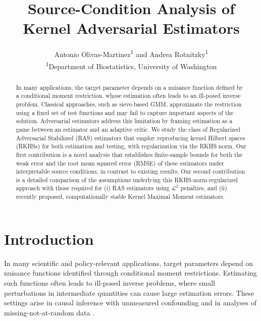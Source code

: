 \documentclass[twoside,11pt]{article}
\begin{document}
\title{Source-Condition Analysis of Kernel Adversarial Estimators}

\author{
Antonio Olivas-Martinez\textsuperscript{1} and Andrea Rotnitzky\textsuperscript{1} \\
\textsuperscript{1}Department of Biostatistics, University of Washington
}

\maketitle

\begin{abstract}
In many applications, the target parameter depends on a nuisance function defined by a conditional moment restriction, whose estimation often leads to an ill-posed inverse problem. Classical approaches, such as sieve-based GMM, approximate the restriction using a fixed set of test functions and may fail to capture important aspects of the solution. Adversarial estimators address this limitation by framing estimation as a game between an estimator and an adaptive critic. We study the class of Regularized Adversarial Stabilized (RAS) estimators that employ reproducing kernel Hilbert spaces (RKHSs) for both estimation and testing, with regularization via the RKHS norm. Our first contribution is a novel analysis that establishes finite-sample bounds for both the weak error and the root mean squared error (RMSE) of these estimators under interpretable source conditions, in contrast to existing results. Our second contribution is a detailed comparison of the assumptions underlying this RKHS-norm-regularized approach with those required for (i) RAS estimators using $\mathcal{L}^2$ penalties, and (ii) recently proposed, computationally stable Kernel Maximal Moment estimators.

    
\end{abstract}

\section{Introduction}\label{sec:intro}

In many scientific and policy-relevant applications, target parameters depend on nuisance functions identified through conditional moment restrictions. Estimating such functions often leads to ill-posed inverse problems, where small perturbations in intermediate quantities can cause large estimation errors. These settings arise in causal inference with unmeasured confounding \citep{santos2011instrumental, severini2012efficiency, escanciano2013identification, freyberger2015identification, miao2018identifying, tchetgen2020introduction, kallus2021causal, ghassami2022minimax, bennett2022inference, bennett2023source, cui2024semiparametric} and in analyses of missing-not-at-random data \citep{miao2016varieties, li2023non, miao2024identification}.
\end{document}
